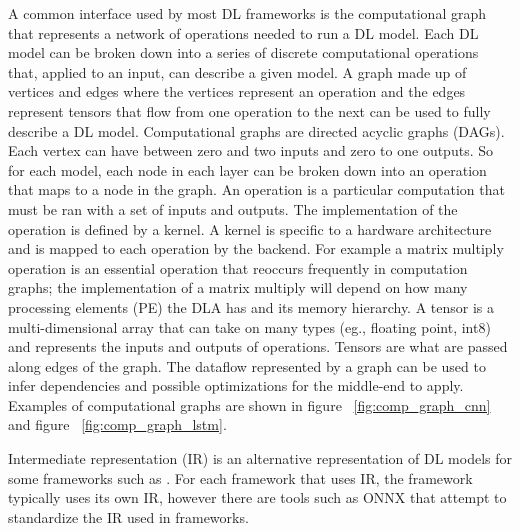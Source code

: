 A common interface used by most DL frameworks is the computational graph
\cite{tensorflow} \cite{cntk} that represents a network of operations needed to
run a DL model. Each DL model can be broken down into a series of discrete
computational operations that, applied to an input, can describe a given
model. A graph made up of vertices and edges where the vertices represent an
operation and the edges represent tensors that flow from one operation to the
next can be used to fully describe a DL model. Computational graphs are
directed acyclic graphs (DAGs).  Each vertex can have between zero and two
inputs and zero to one outputs. So for each model, each node in each layer can
be broken down into an operation that maps to a node in the graph. An operation
is a particular computation that must be ran with a set of inputs and outputs.
The implementation of the operation is defined by a kernel. A kernel is
specific to a hardware architecture and is mapped to each operation by the
backend. For example a matrix multiply operation is an essential operation
that reoccurs frequently in computation graphs; the implementation of a matrix
multiply will depend on how many processing elements (PE) the DLA has and its
memory hierarchy. A tensor is a multi-dimensional array that can take on many
types (eg., floating point, int8) and represents the inputs and outputs of operations.
Tensors are what are passed along edges of the graph. The dataflow represented
by a graph can be used to infer dependencies and possible optimizations for the
middle-end to apply. Examples of computational graphs are shown in figure
~\ref{fig:comp_graph_cnn} and figure ~\ref{fig:comp_graph_lstm}.

Intermediate representation (IR) is an alternative representation of DL models
for some frameworks such as \cite{DLVM} \cite{nGraph} \cite{ONNX}. For each
framework that uses IR, the framework typically uses its own IR, however
there are tools such as ONNX that attempt to standardize the IR used in
frameworks. 

